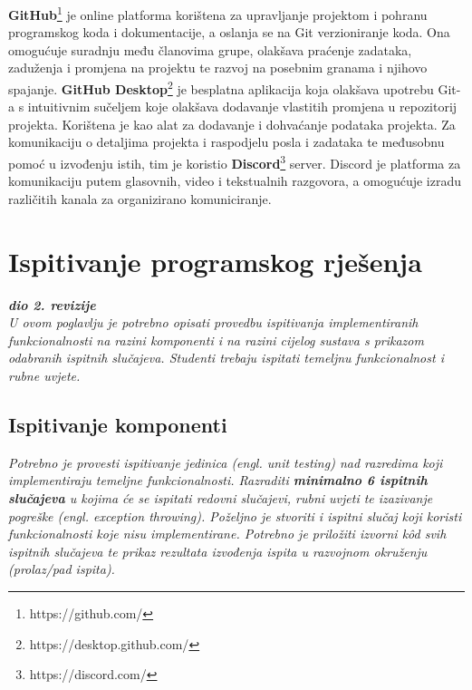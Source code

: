 			\newline\newline
			\noindent\textbf{GitHub}\footnote[21]{https://github.com/} je online platforma korištena za upravljanje projektom i pohranu programskog koda i dokumentacije, a oslanja se na Git verzioniranje koda. Ona omogućuje suradnju među članovima grupe, olakšava praćenje zadataka, zaduženja i promjena na projektu te razvoj na posebnim granama i njihovo spajanje. \textbf{GitHub Desktop}\footnote[22]{https://desktop.github.com/} je besplatna aplikacija koja olakšava upotrebu Git-a s intuitivnim sučeljem koje olakšava dodavanje vlastitih promjena u repozitorij projekta. Korištena je kao alat za dodavanje i dohvaćanje podataka projekta. Za komunikaciju o detaljima projekta i raspodjelu posla i zadataka te međusobnu pomoć u izvođenju istih, tim je koristio \textbf{Discord}\footnote[23]{https://discord.com/} server. Discord je platforma za komunikaciju putem glasovnih, video i tekstualnih razgovora, a omogućuje izradu različitih kanala za organizirano komuniciranje.
			
			\eject 
		
	
		\section{Ispitivanje programskog rješenja}
			
			\textbf{\textit{dio 2. revizije}}\\
			
			 \textit{U ovom poglavlju je potrebno opisati provedbu ispitivanja implementiranih funkcionalnosti na razini komponenti i na razini cijelog sustava s prikazom odabranih ispitnih slučajeva. Studenti trebaju ispitati temeljnu funkcionalnost i rubne uvjete.}
	
			
			\subsection{Ispitivanje komponenti}
			\textit{Potrebno je provesti ispitivanje jedinica (engl. unit testing) nad razredima koji implementiraju temeljne funkcionalnosti. Razraditi \textbf{minimalno 6 ispitnih slučajeva} u kojima će se ispitati redovni slučajevi, rubni uvjeti te izazivanje pogreške (engl. exception throwing). Poželjno je stvoriti i ispitni slučaj koji koristi funkcionalnosti koje nisu implementirane. Potrebno je priložiti izvorni kôd svih ispitnih slučajeva te prikaz rezultata izvođenja ispita u razvojnom okruženju (prolaz/pad ispita). }
			
